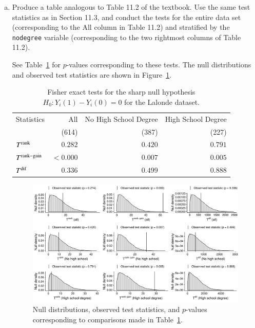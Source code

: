\begin{enumerate}[(a)]
\item
  \begin{quoting}
    Produce a table analogous to Table 11.2 of the textbook. Use the
    same test statistics as in Section 11.3, and conduct the tests for
    the entire data set (corresponding to the All column in Table 11.2)
    and stratified by the \texttt{nodegree} variable (corresponding to
    the two rightmost columns of Table 11.2).
  \end{quoting}
  See Table~\ref{tab:fisher-test} for $p$-values corresponding to
  these tests.  The null distributions and observed test statistics
  are shown in Figure~\ref{fig:fisher-hist}.
  \begin{table}
    \centering
    \begin{tabular}[]{ l r r r}\toprule
      Statistics        & All      & No High School Degree & High School Degree \\
                        & (614)    & (387)                 & (227)              \\
      \midrule
      $T^{\text{rank}}$       & $0.282$  & $0.420$               & $0.791$            \\
      $T^{\text{rank}-\text{gain}}$ & $<0.000$ & $0.007$               & $0.005$            \\
      $T^{\text{dif}}$        & $0.336$  & $0.499$               & $0.888$            \\
      \bottomrule
    \end{tabular}
    \caption{\label{tab:fisher-test} Fisher exact tests for the sharp
      null hypothesis $H_0: Y_i(1) - Y_i(0) = 0$ for the Lalonde
      dataset. }
  \end{table}
  \begin{figure}[]
    \centering
    \includegraphics[width=0.9\textheight, angle = 90]{figures/hist-all.pdf}
    \caption{Null distributions, observed test statistics, and
      $p$-values corresponding to comparisons made in
      Table~\ref{tab:fisher-test}.}
    \label{fig:fisher-hist}
  \end{figure}


\end{enumerate}
